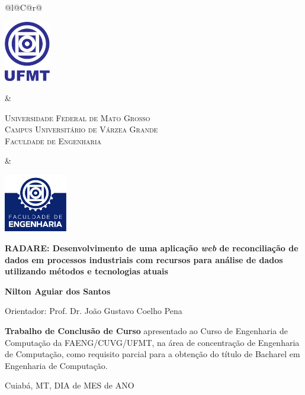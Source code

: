 \begin{titlepage}

\begin{center}

\small

\begin{tabularx}{\linewidth}{@{}l@{}C@{}r@{}}
\parbox[c]{2cm}{\includegraphics[width=2cm]{pre-textuais/figuras/ufmt}} &
\begin{center}
\textsf{\textsc{Universidade Federal de Mato Grosso\\
Campus Universitário de Várzea Grande\\
Faculdade de Engenharia}}
\end{center} &
\parbox[c]{2cm}{\includegraphics[width=2.75cm]{pre-textuais/figuras/faeng}}
\end{tabularx}

\vfill

\LARGE

\textbf{RADARE: Desenvolvimento de uma aplicação \textit{web} de reconciliação de dados em processos industriais com recursos para análise de dados utilizando métodos e tecnologias atuais}

\vfill

\Large

\textbf{Nilton Aguiar dos Santos}

\vfill

\normalsize

Orientador: Prof. Dr. João Gustavo Coelho Pena

\vfill

\hfill
\parbox{0.5\linewidth}{\textbf{Trabalho de Conclusão de Curso}
apresentado ao Curso de Engenharia de Computação da FAENG/CUVG/UFMT,
na área de concentração de Engenharia de Computação,
como requisito parcial para a obtenção do título de Bacharel
em Engenharia de Computação.}

\vfill

\large

Cuiabá, MT, DIA de MES de ANO

\end{center}

\end{titlepage}
